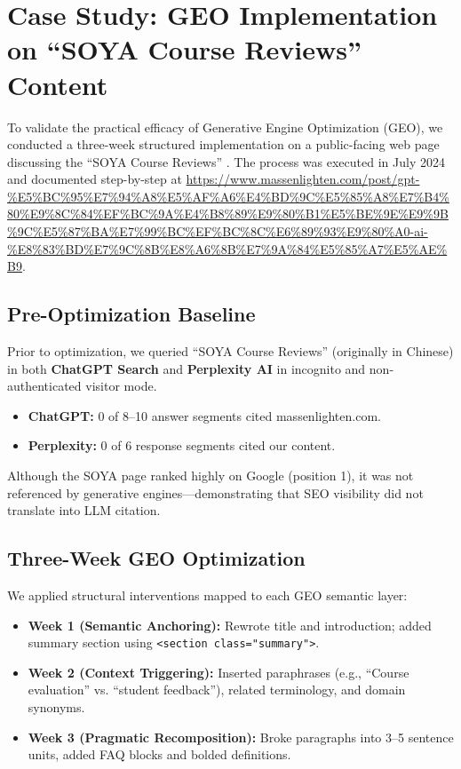 \section{Case Study: GEO Implementation on “SOYA Course Reviews” Content}

To validate the practical efficacy of Generative Engine Optimization (GEO), we conducted a three-week structured implementation on a public-facing web page discussing the “SOYA Course Reviews” . The process was executed in July 2024 and documented step-by-step at \url{https://www.massenlighten.com/post/gpt-%E5%BC%95%E7%94%A8%E5%AF%A6%E4%BD%9C%E5%85%A8%E7%B4%80%E9%8C%84%EF%BC%9A%E4%B8%89%E9%80%B1%E5%BE%9E%E9%9B%9C%E5%87%BA%E7%99%BC%EF%BC%8C%E6%89%93%E9%80%A0-ai-%E8%83%BD%E7%9C%8B%E8%A6%8B%E7%9A%84%E5%85%A7%E5%AE%B9}.

\subsection{Pre-Optimization Baseline}

Prior to optimization, we queried “SOYA Course Reviews” (originally in Chinese) in both \textbf{ChatGPT Search} and \textbf{Perplexity AI} in incognito and non-authenticated visitor mode.

\begin{itemize}
  \item \textbf{ChatGPT:} 0 of 8--10 answer segments cited massenlighten.com.
  \item \textbf{Perplexity:} 0 of 6 response segments cited our content.
\end{itemize}

Although the SOYA page ranked highly on Google (position 1), it was not referenced by generative engines—demonstrating that SEO visibility did not translate into LLM citation.

\subsection{Three-Week GEO Optimization}

We applied structural interventions mapped to each GEO semantic layer:

\begin{itemize}
  \item \textbf{Week 1 (Semantic Anchoring):} Rewrote title and introduction; added summary section using \texttt{<section class="summary">}.
  \item \textbf{Week 2 (Context Triggering):} Inserted paraphrases (e.g., “Course evaluation” vs. “student feedback”), related terminology, and domain synonyms.
  \item \textbf{Week 3 (Pragmatic Recomposition):} Broke paragraphs into 3--5 sentence units, added FAQ blocks and bolded definitions.
\end{itemize}

